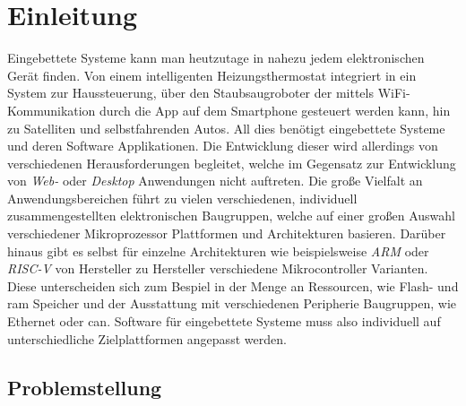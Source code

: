 
\chapter{Einleitung}

Eingebettete Systeme kann man heutzutage in nahezu jedem elektronischen Gerät
finden.
Von einem intelligenten Heizungsthermostat integriert in ein System zur
Haussteuerung, über den Staubsaugroboter der mittels WiFi-Kommunikation durch
die App auf dem Smartphone gesteuert werden kann, hin zu Satelliten und
selbstfahrenden Autos.
All dies benötigt eingebettete Systeme und deren Software Applikationen.
Die Entwicklung dieser wird allerdings von verschiedenen Herausforderungen
begleitet, welche im Gegensatz zur Entwicklung von \textit{Web-} oder
\textit{Desktop} Anwendungen nicht auftreten.\newline
Die große Vielfalt an Anwendungsbereichen führt zu vielen verschiedenen,
individuell zusammengestellten elektronischen Baugruppen, welche auf einer
großen Auswahl verschiedener Mikroprozessor Plattformen und Architekturen
basieren.\newline
Darüber hinaus gibt es selbst für einzelne Architekturen wie beispielsweise
\textit{ARM} oder \textit{RISC-V} von Hersteller zu Hersteller verschiedene
Mikrocontroller Varianten.
Diese unterscheiden sich zum Bespiel in der Menge an Ressourcen, wie Flash-
und \acs{ram} Speicher und der Ausstattung mit verschiedenen
Peripherie Baugruppen, wie Ethernet oder \acs{can}.\newline
Software für eingebettete Systeme muss also individuell auf unterschiedliche
Zielplattformen angepasst werden.

\section{Problemstellung}

